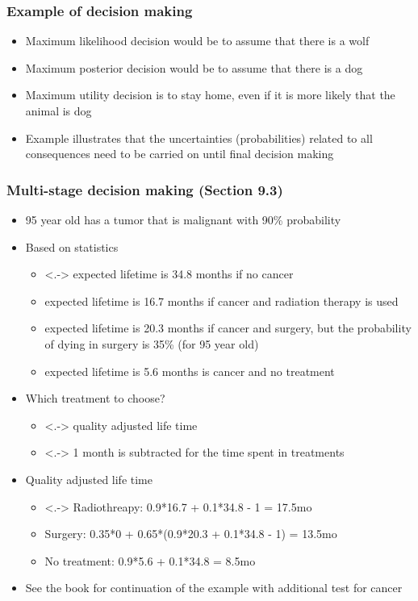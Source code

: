 \documentclass[10pt]{beamer}
\begin{document}
\begin{frame}

\frametitle{Example of decision making}

  \begin{itemize}
  \item<+-> Maximum likelihood decision would be to assume that there is a wolf
  \pause
  \item<+-> Maximum posterior decision would be to assume that there is a dog
  \pause
  \item<+-> Maximum utility decision is to stay home, even if it is more likely that the animal is dog
    \pause
  \item<+-> Example illustrates that the uncertainties (probabilities)
    related to all consequences need to be carried on until final
    decision making
  \end{itemize}

\end{frame}



\begin{frame}

\frametitle{Multi-stage decision making (Section 9.3)}

  \begin{itemize}
  \item<+-> 95 year old has a tumor that is malignant with 90\% probability
  \item<+-> Based on statistics
    \begin{itemize}
    \item<.-> expected lifetime is 34.8 months if no cancer
    \item<+-> expected lifetime is 16.7 months if cancer and radiation therapy is used
    \item<+-> expected lifetime is 20.3 months if cancer and surgery, but the probability of dying in surgery is 35\% (for 95 year old)
    \item<+-> expected lifetime is 5.6 months is cancer and no treatment
    \end{itemize}
  \item<+-> Which treatment to choose?
    \begin{itemize}
    \item<.-> quality adjusted life time
    \item<.-> 1 month is subtracted for the time spent in treatments
    \end{itemize}
   \item<+-> Quality adjusted life time
    \begin{itemize}
    \item<.-> Radiothreapy: 0.9*16.7 + 0.1*34.8 - 1 = 17.5mo
    \item<+-> Surgery: 0.35*0 + 0.65*(0.9*20.3 + 0.1*34.8 - 1) = 13.5mo
    \item<+-> No treatment: 0.9*5.6 + 0.1*34.8 = 8.5mo
    \end{itemize}
  \item<+-> See the book for continuation of the example with
    additional test for cancer
\end{itemize}

\end{frame}
\end{document}
